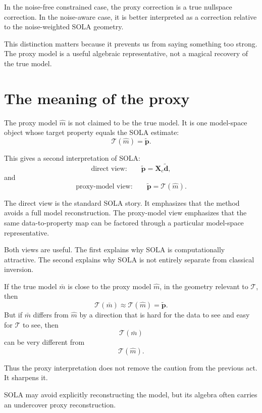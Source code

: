 \documentclass[11pt,openany]{book}
\theoremstyle{definition}
\theoremstyle{remark}
\newcommand{\Tau}{\mathcal{T}}
\begin{document}
\begin{warningbox}
In the noise-free constrained case, the proxy correction is a true nullspace correction. In the
noise-aware case, it is better interpreted as a correction relative to the noise-weighted SOLA
geometry.
\end{warningbox}

This distinction matters because it prevents us from saying something too strong. The proxy
model is a useful algebraic representative, not a magical recovery of the true model.

\section{The meaning of the proxy}

The proxy model \(\hat m\) is not claimed to be the true model. It is one model-space object
whose target property equals the SOLA estimate:
\[
  \Tau(\hat m)=\widetilde{\mathbf p}.
\]

This gives a second interpretation of SOLA:
\[
  \text{direct view:}
  \qquad
  \widetilde{\mathbf p}
  =
  \mathbf X_c\widetilde{\mathbf d},
\]
and
\[
  \text{proxy-model view:}
  \qquad
  \widetilde{\mathbf p}
  =
  \Tau(\hat m).
\]

The direct view is the standard SOLA story. It emphasizes that the method avoids a full model
reconstruction. The proxy-model view emphasizes that the same data-to-property map can be
factored through a particular model-space representative.

Both views are useful. The first explains why SOLA is computationally attractive. The second
explains why SOLA is not entirely separate from classical inversion.

If the true model \(\bar m\) is close to the proxy model \(\hat m\), in the geometry relevant to
\(\Tau\), then
\[
  \Tau(\bar m)\approx \Tau(\hat m)=\widetilde{\mathbf p}.
\]
But if \(\bar m\) differs from \(\hat m\) by a direction that is hard for the data to see and easy
for \(\Tau\) to see, then
\[
  \Tau(\bar m)
\]
can be very different from
\[
  \Tau(\hat m).
\]

Thus the proxy interpretation does not remove the caution from the previous act. It sharpens it.

\begin{lessonbox}
SOLA may avoid explicitly reconstructing the model, but its algebra often carries an undercover
proxy reconstruction.
\end{lessonbox}
\end{document}
